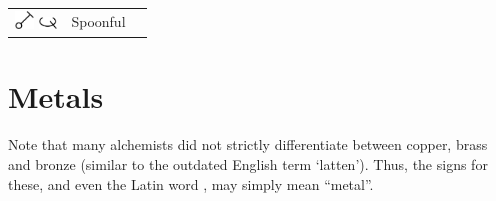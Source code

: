 \documentclass[british,final,landscape]{scrartcl}
\begin{document}
\begin{refsection}
\begin{supertabular}{p{0.3\textwidth}p{0.34\textwidth}p{0.34\textwidth}}
   \includegraphics[width=5mm]{Measures/Spoonful} \includegraphics[width=5mm]{Measures/Spoonful2} & Spoonful & \\
  \end{supertabular}

\section{Metals}

Note that many alchemists did not strictly differentiate between copper, brass and bronze (similar to the outdated English term `latten'). Thus, the signs for these, and even the Latin word ,  may simply mean ``metal''.


\end{refsection}
\end{document}
